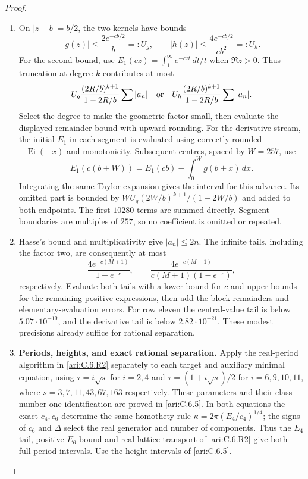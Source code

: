 \begin{proof}
\begin{enumerate}[label=\arabic*.,leftmargin=*]
\item On $|z-b|=b/2$, the two kernels have bounds
\[
 |g(z)|\leq\frac{2e^{-cb/2}}b=:U_g,
 \qquad
 |h(z)|\leq\frac{4e^{-cb/2}}{cb^2}=:U_h.
\]
For the second bound, use
$E_1(cz)=\int_1^\infty e^{-czt}\,dt/t$ when $\Re z>0$.
Thus truncation at degree $k$ contributes at most
\[
 U_g\frac{(2R/b)^{k+1}}{1-2R/b}\sum|a_n|
 \quad\hbox{or}\quad
 U_h\frac{(2R/b)^{k+1}}{1-2R/b}\sum|a_n|.
\]
Select the degree to make the geometric factor small, then evaluate
the displayed remainder bound with upward rounding.
For the derivative stream, the initial $E_1$ in each segment is
evaluated using correctly rounded $-\operatorname{Ei}(-x)$ and
monotonicity. Subsequent centres, spaced by $W=257$, use
\[
 E_1(c(b+W))=E_1(cb)-\int_0^Wg(b+x)\,dx.
\]
Integrating the same Taylor expansion gives the interval for this
advance. Its omitted part is bounded by
$WU_g(2W/b)^{k+1}/(1-2W/b)$ and added to both endpoints.
The first $10280$ terms are summed directly. Segment boundaries
are multiples of $257$, so no coefficient is omitted or repeated.

\item Hasse's bound and multiplicativity give $|a_n|\leq2n$.
The infinite tails, including the factor two, are consequently at
most
\[
 \frac{4e^{-c(M+1)}}{1-e^{-c}},\qquad
 \frac{4e^{-c(M+1)}}{c(M+1)(1-e^{-c})},
\]
respectively. Evaluate both tails with a lower bound for $c$ and upper bounds
for the remaining positive expressions, then add the block
remainders and elementary-evaluation errors. For row eleven the central-value tail is below
$5.07\cdot10^{-19}$, and the derivative tail is below
$2.82\cdot10^{-21}$. These modest precisions already suffice for
rational separation. 

\item \textbf{Periods, heights, and exact rational separation.}
Apply the real-period algorithm in \cref{ari:C.6.R2} separately
to each target and auxiliary minimal equation, using
$\tau=i\sqrt s$ for $i=2,4$ and
$\tau=(1+i\sqrt s)/2$ for $i=6,9,10,11$, where
$s=3,7,11,43,67,163$ respectively.
These parameters and their class-number-one identification are
proved in \cref{ari:C.6.5}. In both equations the exact
$c_4,c_6$ determine the same homothety rule
$\kappa=2\pi(E_4/c_4)^{1/4}$; the signs of $c_6$ and $\Delta$
select the real generator and number of components.
Thus the $E_4$ tail, positive $E_6$ bound and real-lattice
transport of \cref{ari:C.6.R2} give both full-period intervals.
Use the height intervals of \cref{ari:C.6.5}.


\end{enumerate}
\end{proof}
